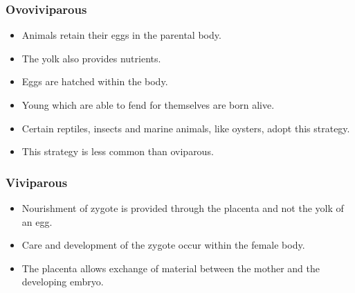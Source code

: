 \documentclass[11pt]{article}
\begin{document}
\subsubsection{Ovoviviparous}
\label{sec:org6a77b15}
\begin{itemize}
\item Animals retain their eggs in the parental body.
\item The yolk also provides nutrients.
\item Eggs are hatched within the body.
\item Young which are able to fend for themselves are born alive.
\item Certain reptiles, insects and marine animals, like oysters, adopt this strategy.
\item This strategy is less common than oviparous.
\end{itemize}
\subsubsection{Viviparous}
\label{sec:orgb3079a6}
\begin{itemize}
\item Nourishment of zygote is provided through the placenta and not the yolk of an egg.
\item Care and development of the zygote occur within the female body.
\item The placenta allows exchange of material between the mother and the developing embryo.
\end{itemize}
\end{document}
